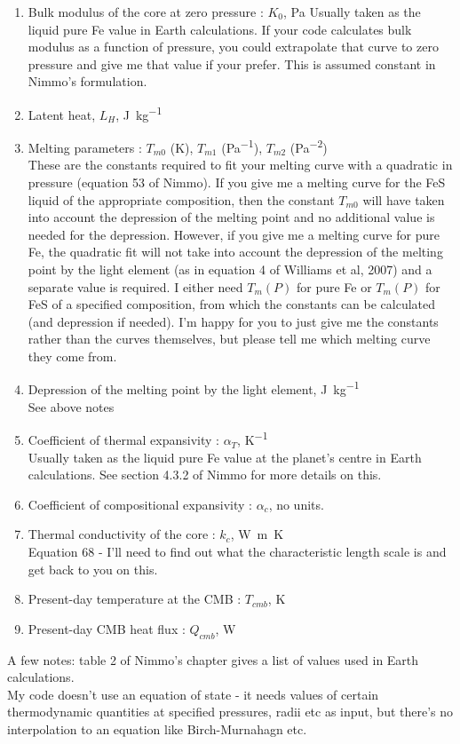 \documentclass[a4paper,12pt]{article}
\begin{document}
\begin{enumerate}
\item{Bulk modulus of the core at zero pressure : $K_0$, \si{\pascal}
Usually taken as the liquid pure Fe value in Earth calculations. If your code calculates bulk modulus as a function of pressure, you could extrapolate that curve to zero pressure and give me that value if your prefer. This is assumed constant in Nimmo's formulation.}
\item{Latent heat, $L_H$, \si{\joule. \kilogram^{-1}}}
\item{Melting parameters : $T_{m0}$ (\si{\kelvin}), $T_{m1}$ (\si{\pascal^{-1}}), $T_{m2}$ (\si{\pascal^{-2}})\\
These are the constants required to fit your melting curve with a quadratic in pressure (equation 53 of Nimmo). If you give me a melting curve for the FeS liquid of the appropriate composition, then the constant $T_{m0}$ will have taken into account the depression of the melting point and no additional value is needed for the depression. However, if you give me a melting curve for pure Fe, the quadratic fit will not take into account the depression of the melting point by the light element (as in equation 4 of Williams et al, 2007) and a separate value is required. I  either need $T_m(P)$ for pure Fe or $T_m(P)$ for FeS of a specified composition, from which the constants can be calculated (and depression if needed). I'm happy for you to just give me the constants rather than the curves themselves, but please tell me which melting curve they come from.}
\item{Depression of the melting point by the light element, \si{\joule. kg^{-1}}\\
See above notes}
\item{Coefficient of thermal expansivity : $\alpha_T$, \si{\kelvin^{-1}}\\
Usually taken as the liquid pure Fe value at the planet's centre in Earth calculations. See section 4.3.2 of Nimmo for more details on this.}
\item{Coefficient of compositional expansivity : $\alpha_c$, no units.}
\item{Thermal conductivity of the core : $k_c$, \si{\watt.m.\kelvin}\\
Equation 68 - I'll need to find out what the characteristic length scale is and get back to you on this.}
\item{Present-day temperature at the CMB : $T_{cmb}$, \si{\kelvin}}
\item{Present-day CMB heat flux : $Q_{cmb}$, \si{\watt}}
\end{enumerate}
A few notes: table 2 of Nimmo's chapter gives a list of values used in Earth calculations. \\My code doesn't use an equation of state - it needs values of certain thermodynamic quantities at specified pressures, radii etc as input, but there's no interpolation to an equation like Birch-Murnahagn etc.
\end{document}
